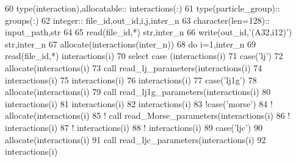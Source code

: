 \begin{DoxyCode}
60     \textcolor{keywordtype}{type}(interaction),\textcolor{keywordtype}{allocatable}:: interactions(:)
61     \textcolor{keywordtype}{type}(particle\_group):: groups(:)
62     \textcolor{keywordtype}{integer}:: file\_id,out\_id,i,j,inter\_n
63     \textcolor{keywordtype}{character(len=128)}:: input\_path,str
64     
65     \textcolor{keyword}{read}(file\_id,*) str,inter\_n
66     \textcolor{keyword}{write}(out\_id,\textcolor{stringliteral}{'(A32,i12)'}) str,inter\_n
67     \textcolor{keyword}{allocate}(interactions(inter\_n))
68     \textcolor{keywordflow}{do} i=1,inter\_n
69         \textcolor{keyword}{read}(file\_id,*) interactions(i)%
70         \textcolor{keywordflow}{select case} (interactions(i)%
71         \textcolor{keywordflow}{case}(\textcolor{stringliteral}{'lj'})
72             \textcolor{keyword}{allocate}(interactions(i)%
73             \textcolor{keyword}{call }read\_lj\_parameters(interactions(i)%
74             interactions(i)%
75             interactions(i)%
76             interactions(i)%
77         \textcolor{keywordflow}{case}(\textcolor{stringliteral}{'lj1g'})
78             \textcolor{keyword}{allocate}(interactions(i)%
79             \textcolor{keyword}{call }read\_lj1g\_parameters(interactions(i)%
80             interactions(i)%
81             interactions(i)%
82             interactions(i)%
83         \textcolor{comment}{!case('morse')}
84         \textcolor{comment}{!   allocate(interactions(i)%
85         \textcolor{comment}{!   call
       read\_Morse\_parameters(interactions(i)%
86         \textcolor{comment}{!   interactions(i)%
87         \textcolor{comment}{!   interactions(i)%
88         \textcolor{comment}{!   interactions(i)%
89         \textcolor{keywordflow}{case}(\textcolor{stringliteral}{'ljc'})
90             \textcolor{keyword}{allocate}(interactions(i)%
91             \textcolor{keyword}{call }read\_ljc\_parameters(interactions(i)%
92             interactions(i)%
}}}}}
\end{DoxyCode}
